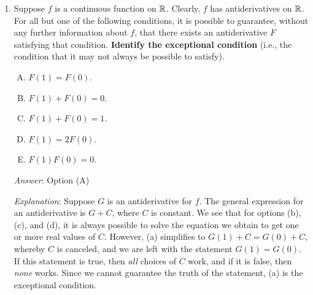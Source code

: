 \documentclass[10pt]{amsart}
\begin{document}
\begin{enumerate}
  \begin{enumerate}[(A)]
  \item $k - 2$
  \item $k - 1$
  \item $k$
  \item $k + 1$
  \item There is no bound in terms of $k$.
  \end{enumerate}

  {\em Answer}: Option (B)

  {\em Explanation}: $F$ and $G$ having the same $k^{th}$ derivative
  is equivalent to requiring that $F - G$ have $k^{th}$ derivative
  equal to zero. For $k = 1$, this gives constant functions
  (polynomials of degree $0$). Each time we increment $k$, the degree
  of the polynomial could potentially go up by $1$. Thus, the answer
  is $k - 1$.

  {\em Performance review}: $22$ out of $25$ people got this. $2$
  chose (E), $1$ chose (C).

  {\em Historical note (earlier appearance this quarter)}: $21$ out of
  $24$ got this. $2$ chose (A), $1$ chose (E).

\item Suppose $f$ is a continuous function on $\mathbb{R}$. Clearly, $f$ has
  antiderivatives on $\mathbb{R}$. For all but one of the following
  conditions, it is possible to guarantee, without any further
  information about $f$, that there exists an antiderivative $F$
  satisfying that condition. {\bf Identify the exceptional condition}
  (i.e., the condition that it may not always be possible to satisfy).

  \begin{enumerate}[(A)]
  \item $F(1) = F(0)$.
  \item $F(1) + F(0) = 0$.
  \item $F(1) + F(0) = 1$.
  \item $F(1) = 2F(0)$.
  \item $F(1)F(0) = 0$.
  \end{enumerate}

  {\em Answer}: Option (A)

  {\em Explanation}: Suppose $G$ is an antiderivative for $f$. The
  general expression for an antiderivative is $G + C$, where $C$ is
  constant. We see that for options (b), (c), and (d), it is always
  possible to solve the equation we obtain to get one or more real
  values of $C$. However, (a) simplifies to $G(1) + C = G(0) + C$,
  whereby $C$ is canceled, and we are left with the statement $G(1) =
  G(0)$. If this statement is true, then {\em all} choices of $C$
  work, and if it is false, then {\em none} works. Since we cannot
  guarantee the truth of the statement, (a) is the exceptional
  condition.


\end{enumerate}
\end{document}

